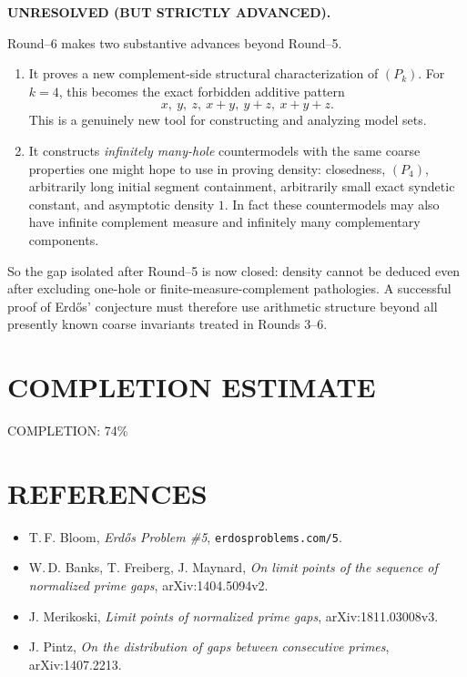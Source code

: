 \textbf{UNRESOLVED (BUT STRICTLY ADVANCED).}

Round--6 makes two substantive advances beyond Round--5.

\begin{enumerate}
\item It proves a new complement-side structural characterization of $(P_k)$.
For $k=4$, this becomes the exact forbidden additive pattern
\[
 x,\ y,\ z,\ x+y,\ y+z,\ x+y+z.
\]
This is a genuinely new tool for constructing and analyzing model sets.

\item It constructs \emph{infinitely many-hole} countermodels with the same coarse properties one might hope to use in proving density: closedness, $(P_4)$, arbitrarily long initial segment containment, arbitrarily small exact syndetic constant, and asymptotic density $1$.
In fact these countermodels may also have infinite complement measure and infinitely many complementary components.
\end{enumerate}

So the gap isolated after Round--5 is now closed: density cannot be deduced even after excluding one-hole or finite-measure-complement pathologies.
A successful proof of Erd\H{o}s' conjecture must therefore use arithmetic structure beyond all presently known coarse invariants treated in Rounds 3--6.


\section{COMPLETION ESTIMATE}

COMPLETION: 74\%


\section{REFERENCES}

\begin{itemize}
\item T.\,F. Bloom, \emph{Erd\H{o}s Problem \#5}, \texttt{erdosproblems.com/5}.
\item W.\,D. Banks, T. Freiberg, J. Maynard, \emph{On limit points of the sequence of normalized prime gaps}, arXiv:1404.5094v2.
\item J. Merikoski, \emph{Limit points of normalized prime gaps}, arXiv:1811.03008v3.
\item J. Pintz, \emph{On the distribution of gaps between consecutive primes}, arXiv:1407.2213.
\end{itemize}
